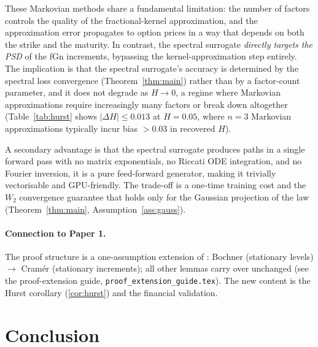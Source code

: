 \documentclass[11pt,a4paper]{article}
\begin{document}
These Markovian methods share a fundamental limitation: the number of
factors controls the quality of the fractional-kernel approximation, and
the approximation error propagates to option prices in a way that depends
on both the strike and the maturity. In contrast, the spectral surrogate
\emph{directly targets the PSD} of the fGn increments, bypassing the
kernel-approximation step entirely. The implication is that the spectral
surrogate's accuracy is determined by the spectral loss convergence
(Theorem~\ref{thm:main}) rather than by a factor-count parameter, and it
does not degrade as $H \to 0$, a regime where Markovian approximations
require increasingly many factors or break down altogether (Table~\ref{tab:hurst}
shows $|\Delta H| \leq 0.013$ at $H=0.05$, where $n=3$ Markovian
approximations typically incur bias $>0.03$ in recovered $H$).

A secondary advantage is that the spectral surrogate produces paths in
a single forward pass with no matrix exponentials, no Riccati ODE
integration, and no Fourier inversion, it is a pure feed-forward
generator, making it trivially vectorisable and GPU-friendly. The
trade-off is a one-time training cost and the $W_2$ convergence
guarantee that holds only for the Gaussian projection of the law
(Theorem~\ref{thm:main}, Assumption~\ref{ass:gauss}).

\paragraph{Connection to Paper 1.}
The proof structure is a one-assumption extension of \citet{TODO-paper1}:
Bochner (stationary levels) $\to$ Cramér (stationary increments);
all other lemmas carry over unchanged (see the proof-extension guide,
\texttt{proof\_extension\_guide.tex}). The new content is the Hurst
corollary (\cref{cor:hurst}) and the financial validation.

\section{Conclusion}
\label{sec:conclusion}
\end{document}
